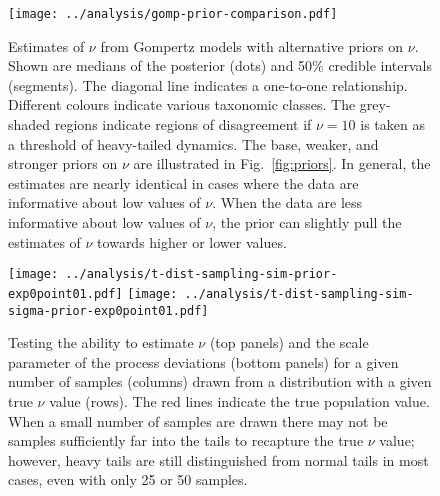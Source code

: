 \clearpage

\begin{figure}[htbp]
\begin{center}
\texttt{[image: ../analysis/gomp-prior-comparison.pdf]}
\caption{
Estimates of $\nu$ from Gompertz models with alternative priors on $\nu$. Shown are medians of the posterior (dots) and 50\% credible intervals (segments). The diagonal line indicates a one-to-one relationship. Different colours indicate various taxonomic classes. The grey-shaded regions indicate regions of disagreement if $\nu = 10$ is taken as a threshold of heavy-tailed dynamics. The base, weaker, and stronger priors on $\nu$ are illustrated in Fig.~\ref{fig:priors}. In general, the estimates are nearly identical in cases where the data are informative about low values of $\nu$. When the data are less informative about low values of $\nu$, the prior can slightly pull the estimates of $\nu$ towards higher or lower values.
}
\label{fig:alt}
\end{center}
\end{figure}

\clearpage

\begin{figure}[htbp]
\begin{center}
\texttt{[image: ../analysis/t-dist-sampling-sim-prior-exp0point01.pdf]}
\texttt{[image: ../analysis/t-dist-sampling-sim-sigma-prior-exp0point01.pdf]}
\caption{
  Testing the ability to estimate $\nu$ (top panels) and the scale parameter of
  the process deviations (bottom panels) for a given number of samples (columns)
  drawn from a distribution with a given true $\nu$ value (rows). The red lines
  indicate the true population value. When a small number of samples are drawn
  there may not be samples sufficiently far into the tails to recapture the
  true $\nu$ value; however, heavy tails are still distinguished from normal
  tails in most cases, even with only 25 or 50 samples.
}
\label{fig:sim-nu}
\end{center}
\end{figure}

\clearpage

